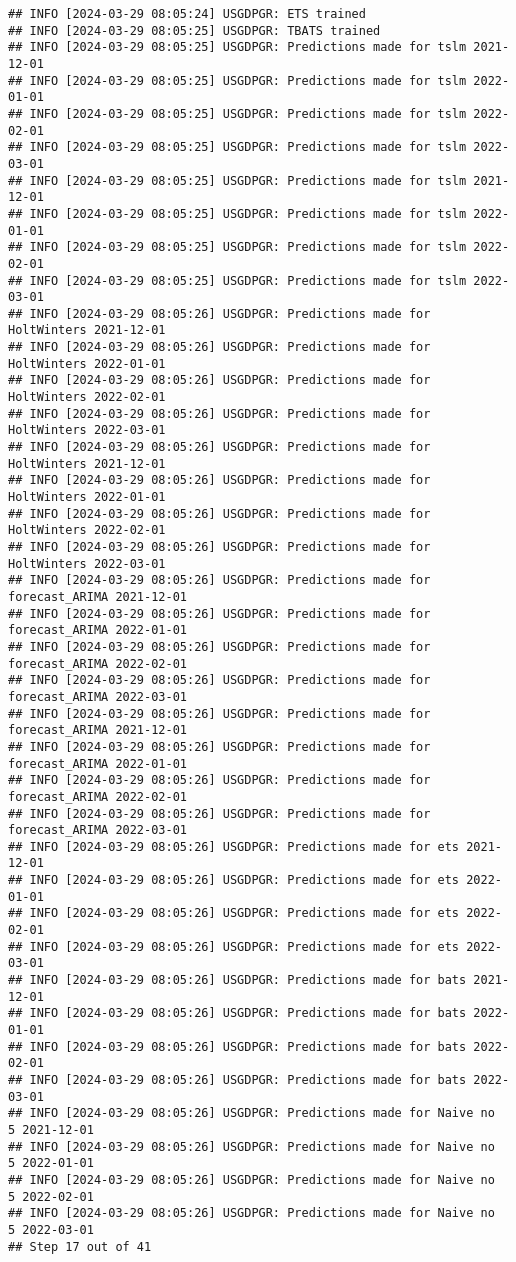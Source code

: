 \documentclass[
]{article}
\begin{document}
\begin{verbatim}
## INFO [2024-03-29 08:05:24] USGDPGR: ETS trained
## INFO [2024-03-29 08:05:25] USGDPGR: TBATS trained
## INFO [2024-03-29 08:05:25] USGDPGR: Predictions made for tslm 2021-12-01
## INFO [2024-03-29 08:05:25] USGDPGR: Predictions made for tslm 2022-01-01
## INFO [2024-03-29 08:05:25] USGDPGR: Predictions made for tslm 2022-02-01
## INFO [2024-03-29 08:05:25] USGDPGR: Predictions made for tslm 2022-03-01
## INFO [2024-03-29 08:05:25] USGDPGR: Predictions made for tslm 2021-12-01
## INFO [2024-03-29 08:05:25] USGDPGR: Predictions made for tslm 2022-01-01
## INFO [2024-03-29 08:05:25] USGDPGR: Predictions made for tslm 2022-02-01
## INFO [2024-03-29 08:05:25] USGDPGR: Predictions made for tslm 2022-03-01
## INFO [2024-03-29 08:05:26] USGDPGR: Predictions made for HoltWinters 2021-12-01
## INFO [2024-03-29 08:05:26] USGDPGR: Predictions made for HoltWinters 2022-01-01
## INFO [2024-03-29 08:05:26] USGDPGR: Predictions made for HoltWinters 2022-02-01
## INFO [2024-03-29 08:05:26] USGDPGR: Predictions made for HoltWinters 2022-03-01
## INFO [2024-03-29 08:05:26] USGDPGR: Predictions made for HoltWinters 2021-12-01
## INFO [2024-03-29 08:05:26] USGDPGR: Predictions made for HoltWinters 2022-01-01
## INFO [2024-03-29 08:05:26] USGDPGR: Predictions made for HoltWinters 2022-02-01
## INFO [2024-03-29 08:05:26] USGDPGR: Predictions made for HoltWinters 2022-03-01
## INFO [2024-03-29 08:05:26] USGDPGR: Predictions made for forecast_ARIMA 2021-12-01
## INFO [2024-03-29 08:05:26] USGDPGR: Predictions made for forecast_ARIMA 2022-01-01
## INFO [2024-03-29 08:05:26] USGDPGR: Predictions made for forecast_ARIMA 2022-02-01
## INFO [2024-03-29 08:05:26] USGDPGR: Predictions made for forecast_ARIMA 2022-03-01
## INFO [2024-03-29 08:05:26] USGDPGR: Predictions made for forecast_ARIMA 2021-12-01
## INFO [2024-03-29 08:05:26] USGDPGR: Predictions made for forecast_ARIMA 2022-01-01
## INFO [2024-03-29 08:05:26] USGDPGR: Predictions made for forecast_ARIMA 2022-02-01
## INFO [2024-03-29 08:05:26] USGDPGR: Predictions made for forecast_ARIMA 2022-03-01
## INFO [2024-03-29 08:05:26] USGDPGR: Predictions made for ets 2021-12-01
## INFO [2024-03-29 08:05:26] USGDPGR: Predictions made for ets 2022-01-01
## INFO [2024-03-29 08:05:26] USGDPGR: Predictions made for ets 2022-02-01
## INFO [2024-03-29 08:05:26] USGDPGR: Predictions made for ets 2022-03-01
## INFO [2024-03-29 08:05:26] USGDPGR: Predictions made for bats 2021-12-01
## INFO [2024-03-29 08:05:26] USGDPGR: Predictions made for bats 2022-01-01
## INFO [2024-03-29 08:05:26] USGDPGR: Predictions made for bats 2022-02-01
## INFO [2024-03-29 08:05:26] USGDPGR: Predictions made for bats 2022-03-01
## INFO [2024-03-29 08:05:26] USGDPGR: Predictions made for Naive no  5 2021-12-01
## INFO [2024-03-29 08:05:26] USGDPGR: Predictions made for Naive no  5 2022-01-01
## INFO [2024-03-29 08:05:26] USGDPGR: Predictions made for Naive no  5 2022-02-01
## INFO [2024-03-29 08:05:26] USGDPGR: Predictions made for Naive no  5 2022-03-01
## Step 17 out of 41
\end{verbatim}
\end{document}
